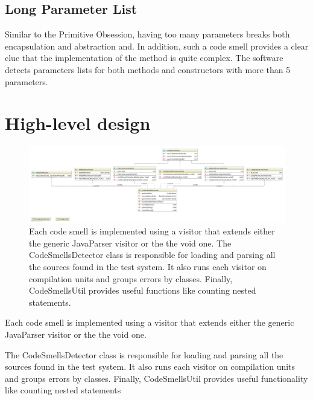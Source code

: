 \documentclass[a4paper]{article}
\begin{document}
\subsection{Long Parameter List}
Similar to the Primitive Obsession, having too many parameters breaks both
encapsulation and abstraction and.
In addition, such a code smell provides a clear clue that the implementation
of the method is quite complex.
The software detects parameters lists for both methods and constructors
with more than 5 parameters.

\section{High-level design}

\begin{figure}
	\includegraphics[width=\textwidth]{codesmellspng}
	\caption{Each code smell is implemented using a visitor that extends either
		the generic JavaParser visitor or the the void one.
		The CodeSmellsDetector class is responsible for loading and parsing all
		the sources found in the test system.
		It also runs each visitor on compilation units and
		groups errors by classes.
		Finally, CodeSmellsUtil provides useful functions like counting
		nested statements.}
\end{figure}

Each code smell is implemented using a visitor that extends either
the generic JavaParser visitor or the the void one.

The CodeSmellsDetector class is responsible for loading and parsing all
the sources found in the test system.
It also runs each visitor on compilation units and
groups errors by classes.
Finally, CodeSmellsUtil provides useful functionality like counting
nested statements



\end{document}
